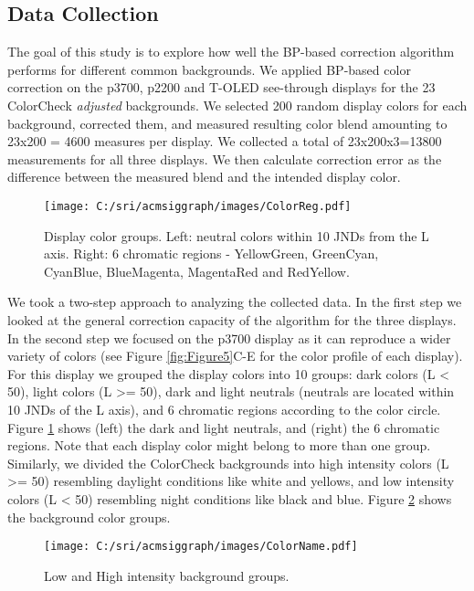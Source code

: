 \documentclass[annual]{acmsiggraph}
\begin{document}
\subsection{Data Collection}
The goal of this study is to explore how well the BP-based correction algorithm performs for different common backgrounds. We applied BP-based color correction on the p3700, p2200 and T-OLED see-through displays for the 23 ColorCheck \textit{adjusted}  backgrounds. We selected 200 random display colors for each background, corrected them, and measured resulting color blend amounting to 23x200 = 4600 measures per display. We collected a total of 23x200x3=13800 measurements for all three displays. We then calculate correction error as the difference between the measured blend and the intended display color.
\begin{figure}[ht]
  \centering
  \texttt{[image: C:/sri/acmsiggraph/images/ColorReg.pdf]}
  \caption{Display color groups. Left: neutral colors within 10 JNDs from the L axis. Right: 6 chromatic regions - YellowGreen, GreenCyan, CyanBlue, BlueMagenta, MagentaRed and RedYellow.}
\label{fig:Figure9}
\end{figure}


We took a two-step approach to analyzing the collected data. In the first step we looked at the general correction capacity of the algorithm for the three displays. In the second step we focused on the p3700 display as it can reproduce a wider variety of colors (see Figure \ref{fig:Figure5}C-E for the color profile of each display). For this display we grouped the display colors into 10 groups: dark colors (L < 50), light colors (L >= 50), dark and light neutrals (neutrals are located within 10 JNDs of the L axis), and 6 chromatic regions according to the color circle. Figure \ref{fig:Figure9} shows (left) the dark and light neutrals, and (right) the 6 chromatic regions. Note that each display color might belong to more than one group. Similarly, we divided the ColorCheck backgrounds into high intensity colors (L >= 50) resembling daylight conditions like white and yellows, and low intensity colors (L < 50) resembling night conditions like black and blue. Figure \ref{fig:Figure10} shows the background color groups.

\begin{figure}[ht]
  \centering
  \texttt{[image: C:/sri/acmsiggraph/images/ColorName.pdf]}
  \caption{Low and High intensity background groups.}
  \label{fig:Figure10}
\end{figure}
\end{document}
